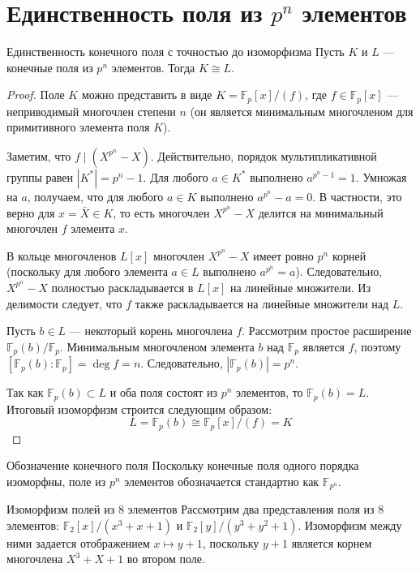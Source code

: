 
\section{Единственность поля из $p^n$ элементов}

\begin{Theorem}{Единственность конечного поля с точностью до изоморфизма}{}
	Пусть $K$ и $L$ --- конечные поля из $p^n$ элементов. Тогда $K \cong L$.
\end{Theorem}

\begin{proof}
	Поле $K$ можно представить в виде $K = \mathbb{F}_p[x]/(f)$, где $f \in \mathbb{F}_p[x]$ --- неприводимый многочлен степени $n$ (он является минимальным многочленом для примитивного элемента поля $K$).

	Заметим, что $f \mid (X^{p^n} - X)$. Действительно, порядок мультипликативной группы равен $|K^*| = p^n - 1$. Для любого $a \in K^*$ выполнено $a^{p^n - 1} = 1$. Умножая на $a$, получаем, что для любого $a \in K$ выполнено $a^{p^n} - a = 0$. В частности, это верно для $x = \bar{X} \in K$, то есть многочлен $X^{p^n} - X$ делится на минимальный многочлен $f$ элемента $x$.

	В кольце многочленов $L[x]$ многочлен $X^{p^n} - X$ имеет ровно $p^n$ корней (поскольку для любого элемента $a \in L$ выполнено $a^{p^n} = a$). Следовательно, $X^{p^n} - X$ полностью раскладывается в $L[x]$ на линейные множители. Из делимости следует, что $f$ также раскладывается на линейные множители над $L$.

	Пусть $b \in L$ --- некоторый корень многочлена $f$. Рассмотрим простое расширение $\mathbb{F}_p(b) / \mathbb{F}_p$. Минимальным многочленом элемента $b$ над $\mathbb{F}_p$ является $f$, поэтому $[\mathbb{F}_p(b) : \mathbb{F}_p] = \deg f = n$. Следовательно, $|\mathbb{F}_p(b)| = p^n$.

	Так как $\mathbb{F}_p(b) \subset L$ и оба поля состоят из $p^n$ элементов, то $\mathbb{F}_p(b) = L$.
	Итоговый изоморфизм строится следующим образом:
	\[ L = \mathbb{F}_p(b) \cong \mathbb{F}_p[x]/(f) = K \]
\end{proof}

\begin{Remark}{Обозначение конечного поля}{}
	Поскольку конечные поля одного порядка изоморфны, поле из $p^n$ элементов обозначается стандартно как $\mathbb{F}_{p^n}$.
\end{Remark}

\begin{Example}{Изоморфизм полей из 8 элементов}{}
	Рассмотрим два представления поля из 8 элементов: $\mathbb{F}_2[x]/(x^3+x+1)$ и $\mathbb{F}_2[y]/(y^3+y^2+1)$. Изоморфизм между ними задается отображением $x \mapsto y+1$, поскольку $y+1$ является корнем многочлена $X^3+X+1$ во втором поле.
\end{Example}
